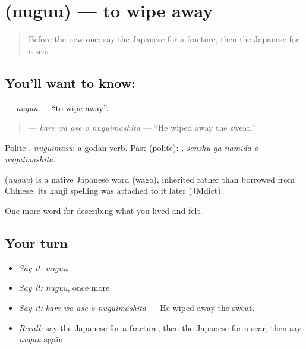 \section[\texorpdfstring{\ja{ぬぐう} (nuguu)}{ぬぐう (nuguu)}]{ (nuguu) — to wipe away}

\label{lesson:JA-C449-nuguu}



\begin{quote}
Before the new one: say the Japanese for a fracture, then the Japanese for a scar.
\end{quote}

\subsection*{You'll want to know: }
\textbf{} — \emph{nuguu} — \textquotedblleft{}to wipe away\textquotedblright{}.

\begin{quote}
\textbf{  } — \emph{kare wa ase o nuguimashita} — \textquotedblleft{}He wiped away the sweat.\textquotedblright{}
\end{quote}

Polite \textbf{}, \emph{nuguimasu}; a godan verb. Past (polite): \textbf{  }, \emph{senshu ga namida o nuguimashita}.

\begin{cousinweb}
\textbf{} (\emph{nuguu}) is a native Japanese word (wago), inherited rather than borrowed from Chinese; its kanji spelling was attached to it later (JMdict).
\end{cousinweb}

\begin{grammarlens}[title={What you've built}]
One more word for describing what you lived and felt.
\end{grammarlens}

\subsection*{Your turn}
\begin{itemize}
\raggedright
  \item \emph{Say it:} \emph{nuguu}
  \item \emph{Say it:} \emph{nuguu}, once more
  \item \emph{Say it:} \emph{kare wa ase o nuguimashita} — He wiped away the sweat.
  \item \emph{Recall:} say the Japanese for a fracture, then the Japanese for a scar, then say \emph{nuguu} again
\end{itemize}

